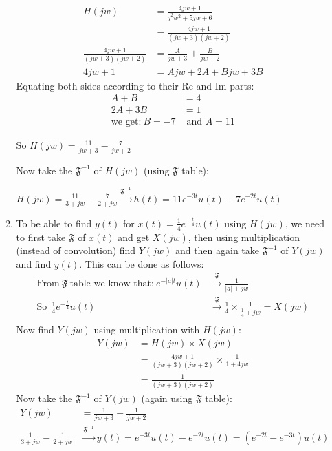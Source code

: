 \documentclass[10pt,a4paper, margin=1in]{article}
\begin{document}
\begin{enumerate}
\begin{enumerate}
		\begin{align*}
		H(jw) &= \frac{4jw+1}{j^2w^2+5jw+6} \\
		      &= \frac{4jw+1}{(jw+3)(jw+2)} \\
		\frac{4jw+1}{(jw+3)(jw+2)} &= \frac{A}{jw+3} + \frac{B}{jw+2} \\ 
		4jw + 1 &= Ajw + 2A + Bjw + 3B 
		\end{align*}
		Equating both sides according to their Re and Im parts:
		\begin{align*}
		A + B &= 4 \\
		2A + 3B &= 1 \\
		\text{we get:} \ B=-7 &\text{ and } A=11
		\end{align*}
		\begin{center}
		So $H(jw)=\frac{11}{jw+3} - \frac{7}{jw+2}$	\\
		\end{center}
		
		Now take the $\mathfrak{F}^{-1}$ of $H(jw)$ (using $\mathfrak{F}$ table):
		\begin{center}
			$H(jw)=\frac{11}{3+jw} - \frac{7}{2+jw} \xrightarrow{\mathfrak{F}^{-1}} h(t)=11e^{-3t}u(t)-7e^{-2t}u(t)$ \\ 
		\end{center}		
	\item
		To be able to find $y(t)$ for $x(t)=\frac{1}{4}e^{-\frac{t}{4}}u(t)$ using $H(jw)$, we need to first take $\mathfrak{F}$ of $x(t)$ and get $X(jw)$, then using multiplication (instead of convolution) find $Y(jw)$ and then again take $\mathfrak{F}^{-1}$ of $Y(jw)$ and find $y(t)$. This can be done as follows:
		\begin{align*}
		\text{From} \ \mathfrak{F} \ \text{table we know that:} \ e^{-|a|t}u(t) &\xrightarrow{\mathfrak{F}} \frac{1}{|a|+jw} \\		
		\text{So} \ \ \frac{1}{4}e^{-\frac{t}{4}}u(t) &\xrightarrow{\mathfrak{F}} \frac{1}{4}\times \frac{1}{\frac{1}{4}+jw} = X(jw) \\
		\end{align*}
		Now find $Y(jw)$ using multiplication with $H(jw)$:
		\begin{align*}
		 Y(jw) &= H(jw)\times X(jw) \\
		      &= \frac{4jw+1}{(jw+3)(jw+2)} \times \frac{1}{1+4jw}\\
		      &= \frac{1}{(jw+3)(jw+2)} 
		\end{align*}
		Now take the $\mathfrak{F}^{-1}$ of $Y(jw)$ (again using $\mathfrak{F}$ table):
		\begin{align*}
		Y(jw) &= \frac{1}{jw+3} - \frac{1}{jw+2}\\
		\frac{1}{3+jw} - \frac{1}{2+jw} &\xrightarrow{\mathfrak{F}^{-1}} y(t)=e^{-3t}u(t)-e^{-2t}u(t) = (e^{-2t}-e^{-3t})u(t)
		\end{align*}
	\end{enumerate}
\end{enumerate}
\end{document}
